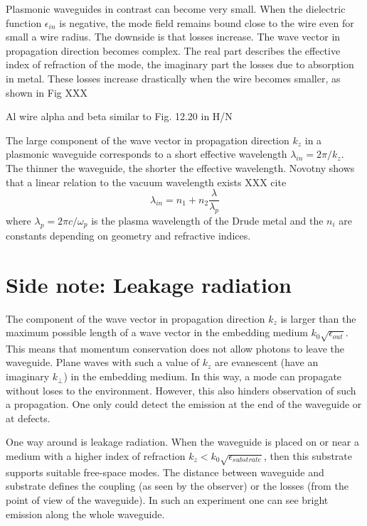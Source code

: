 Plasmonic waveguides in contrast can become very small. When the dielectric function $\epsilon_{in}$ is negative, the mode field remains bound close to the wire even for small a wire radius. The downside is that losses increase. The wave vector in propagation direction becomes complex. The real part describes the effective index of refraction of the mode, the imaginary part the losses due to absorption in metal. These losses increase drastically when the wire becomes smaller, as shown in Fig XXX

\begin{marginfigure}
  \caption{Al wire alpha and beta similar to Fig. 12.20 in H/N}
\end{marginfigure}


The large component of the wave vector in propagation direction $k_z$ in a plasmonic waveguide corresponds to a short effective wavelength $\lambda_{in} = 2 \pi / k_z$. The thinner the waveguide, the shorter the effective wavelength. Novotny shows that  a linear relation to the vacuum wavelength exists XXX cite
\begin{equation}
  \lambda_{in} = n_1 + n_2 \frac{\lambda}{\lambda_{p}}
\end{equation}
where $\lambda_p = 2 \pi c / \omega_p$ is the plasma wavelength of the Drude metal and the $n_i$ are constants depending on geometry and refractive indices.


\section{Side note: Leakage radiation}

The component of the wave vector in propagation direction $k_z$ is larger than the maximum possible length of a wave vector in the embedding medium $k_0 \sqrt{\epsilon_{out}}$. This means that momentum conservation does not allow photons to leave the waveguide. Plane waves with such a value of $k_z$ are evanescent (have an imaginary $k_\perp$) in the embedding medium. In this way, a mode can propagate without loses to the environment. However, this also hinders observation of such a propagation. One only could detect the emission at the end of the waveguide or at defects.

One way around is leakage radiation. When the waveguide is placed on or near a medium with a higher index of refraction $k_z < k_0 \sqrt{\epsilon_{substrate}}$, then this substrate supports suitable free-space modes. The distance between waveguide and substrate defines the coupling (as seen by the observer) or the losses (from the point of view of the waveguide). In such an experiment one can see bright emission along the whole waveguide.



